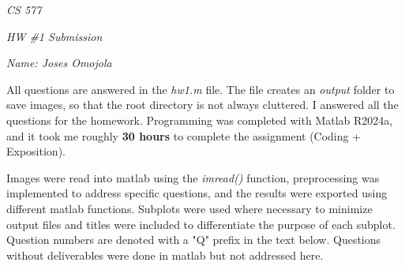 \documentclass[12pt]{report}
\begin{document}
\centerline{\it CS 577}
\centerline{\it HW \#1 Submission}
\centerline{\it Name: Joses Omojola}

All questions are answered in the \emph{hw1.m} file. The file creates an \emph{output} folder to save images, so that 
the root directory is not always cluttered. I answered all the questions for the homework. Programming was completed 
with Matlab R2024a, and it took me roughly \textbf{30 hours} to complete the assignment (Coding + Exposition).

Images were read into matlab using the \emph{imread()} function, preprocessing was implemented to address specific
questions, and the results were exported using different matlab functions. Subplots were used where necessary to 
minimize output files and titles were included to differentiate the purpose of each subplot. Question numbers are
denoted with a "Q" prefix in the text below. Questions without deliverables were done in matlab but not addressed here.
\end{document}
